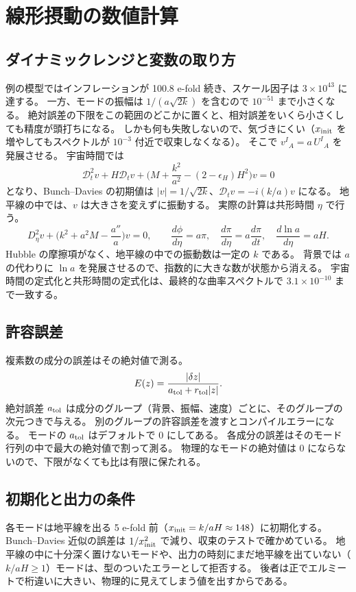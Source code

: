 \documentclass[a4paper,11pt]{ltjsarticle}
\newcommand{\Dt}{\mathcal{D}_t}
\begin{document}
\section{線形摂動の数値計算}
\label{app:numerics}

\subsection{ダイナミックレンジと変数の取り方}
例の模型ではインフレーションが 100.8 e-fold 続き、スケール因子は $3\times10^{43}$ に達する。
一方、モードの振幅は $1/(a\sqrt{2k})$ を含むので $10^{-51}$ まで小さくなる。
絶対誤差の下限をこの範囲のどこかに置くと、相対誤差をいくら小さくしても精度が頭打ちになる。
しかも何も失敗しないので、気づきにくい（$x_{\rm init}$ を増やしてもスペクトルが $10^{-3}$ 付近で収束しなくなる）。
そこで $v^I{}_A=a\,U^I{}_A$ を発展させる。
宇宙時間では
\[
\Dt^2v+H\Dt v+\Big(M+\frac{k^2}{a^2}-(2-\epsilon_H)H^2\Big)v=0
\]
となり、Bunch--Davies の初期値は $|v|=1/\sqrt{2k}$、$\Dt v=-i(k/a)v$ になる。
地平線の中では、$v$ は大きさを変えずに振動する。
実際の計算は共形時間 $\eta$ で行う。
\[
D_\eta^2v+\Big(k^2+a^2M-\frac{a''}{a}\Big)v=0,\qquad
\frac{d\phi}{d\eta}=a\pi,\quad\frac{d\pi}{d\eta}=a\frac{d\pi}{dt},\quad\frac{d\ln a}{d\eta}=aH .
\]
Hubble の摩擦項がなく、地平線の中での振動数は一定の $k$ である。
背景では $a$ の代わりに $\ln a$ を発展させるので、指数的に大きな数が状態から消える。
宇宙時間の定式化と共形時間の定式化は、最終的な曲率スペクトルで $3.1\times10^{-10}$ まで一致する。

\subsection{許容誤差}
複素数の成分の誤差はその絶対値で測る。
\[
E(z)=\frac{|\delta z|}{a_{\rm tol}+r_{\rm tol}|z|} .
\]
絶対誤差 $a_{\rm tol}$ は成分のグループ（背景、振幅、速度）ごとに、そのグループの次元つきで与える。
別のグループの許容誤差を渡すとコンパイルエラーになる。
モードの $a_{\rm tol}$ はデフォルトで 0 にしてある。
各成分の誤差はそのモード行列の中で最大の絶対値で割って測る。
物理的なモードの絶対値は 0 にならないので、下限がなくても比は有限に保たれる。

\subsection{初期化と出力の条件}
各モードは地平線を出る 5 e-fold 前（$x_{\rm init}=k/aH\approx148$）に初期化する。
Bunch--Davies 近似の誤差は $1/x_{\rm init}^2$ で減り、収束のテストで確かめている。
地平線の中に十分深く置けないモードや、出力の時刻にまだ地平線を出ていない（$k/aH\geq1$）モードは、型のついたエラーとして拒否する。
後者は正でエルミートで桁違いに大きい、物理的に見えてしまう値を出すからである。
\end{document}
